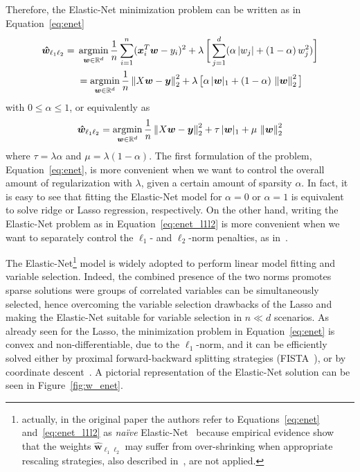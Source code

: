 			Therefore, the Elastic-Net minimization problem can be written as in Equation~\eqref{eq:enet}
			\begin{equation} \label{eq:enet}
				\begin{aligned}
				\bm{\hat w}_{\ell_1\ell_2} = {} & \mathop{\mathrm{argmin}}\limits_{\bm{w} \in \mathbb{R}^d} \frac{1}{n} \sum_{i=1}^n (\bm{x}_i^T\bm{w} - y_i)^2 + \lambda\,\bigg[ \sum_{j=1}^d (\alpha\,|w_j| + (1-\alpha)\,w_j^2) \bigg] \\
				& = \mathop{\mathrm{argmin}}\limits_{\bm{w} \in \mathbb{R}^d} \frac{1}{n} \left\lVert X\bm{w} - \bm{y}\right\rVert_2^2 + \lambda\,\big[ \alpha\,|\bm{w}|_1 + (1-\alpha)\,\left\lVert\bm{w}\right\rVert_2^2 \big]
			\end{aligned}
		  \end{equation}
			with $0 \leq \alpha \leq 1$, or equivalently as
			\begin{equation} \label{eq:enet_l1l2}
			\bm{\hat w}_{\ell_1\ell_2} = \mathop{\mathrm{argmin}}\limits_{\bm{w} \in \mathbb{R}^d} \frac{1}{n} \left\lVert X\bm{w} - \bm{y}\right\rVert_2^2 + \tau\,|\bm{w}|_1 + \mu\,\left\lVert\bm{w}\right\rVert_2^2
			\end{equation}
			where $\tau = \lambda\alpha$ and $\mu = \lambda(1-\alpha)$. The first formulation of the problem, Equation~\eqref{eq:enet}, is more convenient when we want to control the overall amount of regularization with $\lambda$, given a certain amount of sparsity $\alpha$. In fact, it is easy to see that fitting the Elastic-Net model for $\alpha=0$ or $\alpha=1$ is equivalent to solve ridge or Lasso regression, respectively. On the other hand, writing the Elastic-Net problem as in Equation~\eqref{eq:enet_l1l2} is more convenient when we want to separately control the $\ell_1$- and $\ell_2$-norm penalties, as in~\cite{de2009regularized}.

			The Elastic-Net\footnote{actually, in the original paper the authors refer to Equations~\eqref{eq:enet} and~\eqref{eq:enet_l1l2} as \textit{na\"ive} Elastic-Net~\cite{zou2005regularization} because empirical evidence show that the weights $\bm{\hat w}_{\ell_1\ell_2}$ may suffer from over-shrinking when appropriate rescaling strategies, also described in~\cite{de2009regularized},  are not applied.} model is widely adopted to perform linear model fitting and variable selection. Indeed, the combined presence of the two norms promotes sparse solutions were groups of correlated variables can be simultaneously selected, hence overcoming the variable selection drawbacks of the Lasso and making the Elastic-Net suitable for variable selection in $n \ll d$ scenarios.
			As already seen for the Lasso, the minimization problem in Equation~\eqref{eq:enet} is convex and non-differentiable, due to the $\ell_1$-norm, and it can be efficiently solved either by proximal forward-backward splitting strategies (\eg FISTA~\cite{beck2009fast}), or by coordinate descent~\cite{wu2008coordinate}. A pictorial representation of the Elastic-Net solution can be seen in Figure~\ref{fig:w_enet}.

